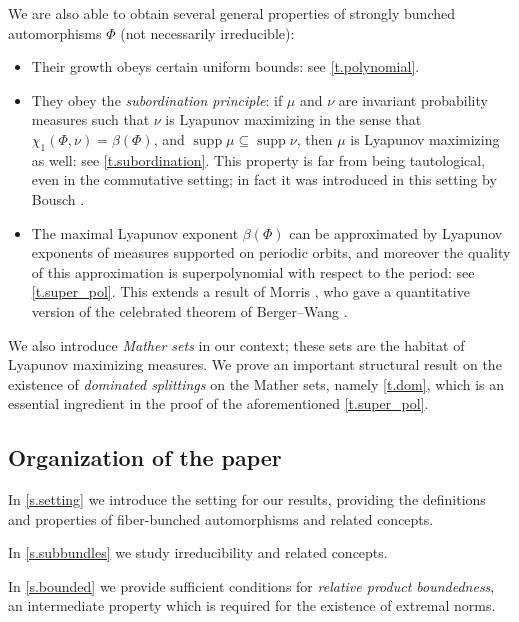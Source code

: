 \documentclass[JEP,XML,SOM,Unicode]{cedram}
\theoremstyle{plain}
\theoremstyle{definition}
\DeclareMathOperator{\supp}{supp}
\begin{document}
We are also able to obtain several general properties of strongly bunched automorphisms $\Phi$ (not necessarily irreducible):
\begin{itemize}

\item Their growth obeys certain uniform bounds: see \cref{t.polynomial}.

\item They obey the \emph{subordination principle}: if $\mu$ and $\nu$ are invariant probability measures such that $\nu$ is Lyapunov maximizing in the sense that $\chi_1(\Phi,\nu) = \beta(\Phi)$, and $\supp \mu \subseteq \supp \nu$, then $\mu$ is Lyapunov maximizing as well: see \cref{t.subordination}.
This property is far from being tautological, even in the commutative setting; in fact it was introduced in this setting by Bousch \cite{Bousch_Walters}.

\item The maximal Lyapunov exponent $\beta(\Phi)$ can be approximated by Lyapunov expo\-nents of measures supported on periodic orbits, and moreover the quality of this approximation is superpolynomial with respect to the period: see \cref{t.super_pol}.
This extends a result of Morris \cite{Morris_rapidly}, who gave a quantitative version of the celebrated theorem of Berger--Wang \cite{BWang}.

\end{itemize}

We also introduce \emph{Mather sets} in our context; these sets are the habitat of Lyapunov maximizing measures. We prove an important structural result on the existence of \emph{dominated splittings} on the Mather sets, namely \cref{t.dom}, which is an essential ingredient in the proof of the aforementioned \cref{t.super_pol}.

\subsection{Organization of the paper}

In \cref{s.setting} we introduce the setting for our results, providing the definitions and properties of fiber-bunched automorphisms and related concepts.

In \cref{s.subbundles} we study irreducibility and related concepts.

In \cref{s.bounded} we provide sufficient conditions for \emph{relative product boundedness}, an intermediate property which is required for the existence of extremal norms.
\end{document}
